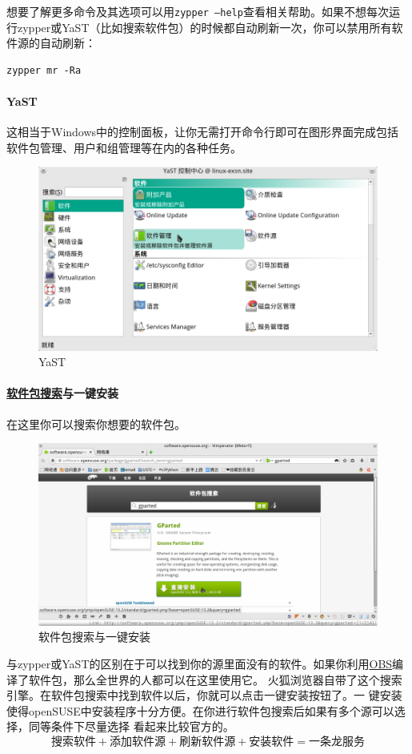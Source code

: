 \documentclass[11pt,openany]{book}
\newcommand{\command}[1]{\texttt{\textcolor{codec}{#1}}}
\newcommand{\zy}{zypper或YaST}
\begin{document}
想要了解更多命令及其选项可以用\command{zypper --help}查看相关帮助。如果不想每次运行\zy （比如搜索软件包）的时候都自动刷新一次，你可以禁用所有软件源的自动刷新：
\begin{Verbatim}[formatcom=\color{codec}]
    zypper mr -Ra
\end{Verbatim}

\paragraph{YaST} 这相当于Windows中的控制面板，让你无需打开命令行即可在图形界面完成包括软件包管理、用户和组管理等在内的各种任务。
\begin{figure}[htb]
\centering
\includegraphics[width=\textwidth]{./pic/yast.png} 
\caption{YaST}\label{yast}
\end{figure}
\paragraph[软件包搜索与一键安装]{\href{http://software.opensuse.org/packages}{软件包搜索}与一键安装} 在这里你可以搜索你想要的软件包。

\begin{figure}[htb]
\centering
\includegraphics[width=\textwidth]{./pic/software.png} 
\caption{软件包搜索与一键安装}\label{soft}
\end{figure}
与\zy 的区别在于可以找到你的源里面没有的软件。如果你利用\href{https://build.opensuse.org/}{OBS}编译了软件包，那么全世界的人都可以在这里使用它。
火狐浏览器自带了这个搜索引擎。在软件包搜索中找到软件以后，你就可以点击一键安装按钮了。一
键安装使得openSUSE中安装程序十分方便。在你进行软件包搜索后如果有多个源可以选择，同等条件下尽量选择
看起来比较官方的。\[\text{搜索软件}+\text{添加软件源}+\text{刷新软件源}+\text{安装软件}=\text{一条龙服务}\]
\end{document}
